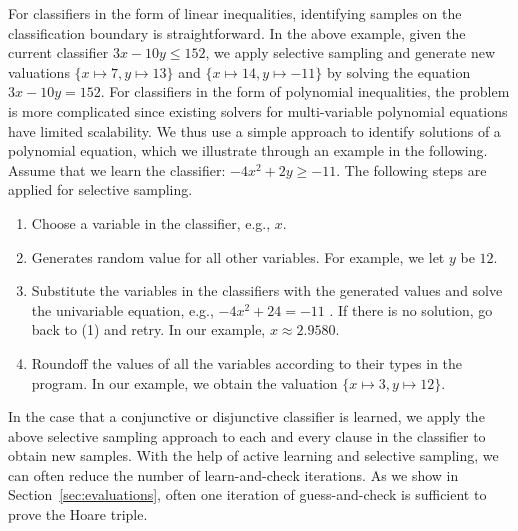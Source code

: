 For classifiers in the form of linear inequalities, identifying samples on the classification boundary is straightforward. In the above example, given the current classifier $3x-10y \leq 152$, we apply selective sampling and generate new valuations $\{x \mapsto 7, y \mapsto 13\}$ and $\{x \mapsto 14, y \mapsto -11\}$ by solving the equation $3x-10y = 152$. %
For classifiers in the form of polynomial inequalities, the problem is more complicated since existing solvers for multi-variable polynomial equations have limited scalability. We thus use a simple approach to identify solutions of a polynomial equation, which we illustrate through an example in the following. Assume that we learn the classifier: $-4x^2+2y \geq -11$. The following steps are applied for selective sampling.
\begin{enumerate}
\item Choose a variable in the classifier, e.g., $x$.
\item Generates random value for all other variables. For example, we let $y$ be $12$.
\item Substitute the variables in the classifiers with the generated values and solve the univariable equation, e.g., $-4x^2+24 = -11$ . If there is no solution, go back to (1) and retry.
In our example, $x \approx 2.9580$.
\item Roundoff the values of all the variables according to their types in the program. In our example, we obtain the valuation $\{x \mapsto 3, y \mapsto 12\}$.
\end{enumerate}
In the case that a conjunctive or disjunctive classifier is learned, we apply the above selective sampling approach to each and every clause in the classifier to obtain new samples. With the help of active learning and selective sampling, we can often reduce the number of learn-and-check iterations. As we show in Section~\ref{sec:evaluations}, often one iteration of guess-and-check is sufficient to prove the Hoare triple.

